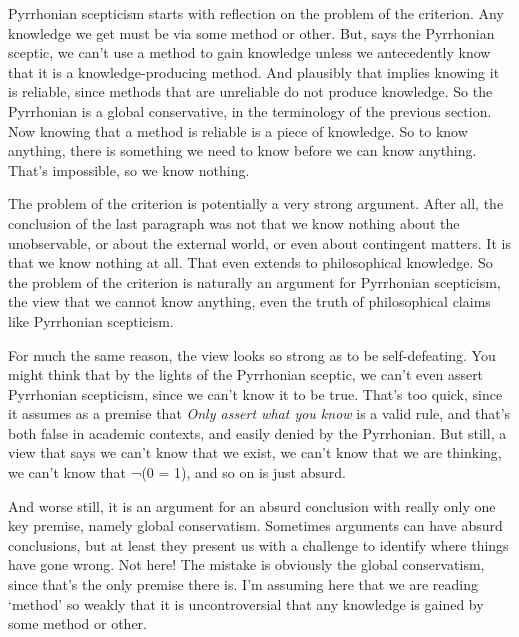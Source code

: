 \documentclass[
  10pt,
  letterpaper,
  twoside]{scrbook}
\begin{document}
Pyrrhonian scepticism starts with reflection on the problem of the
criterion. Any knowledge we get must be via some method or other. But,
says the Pyrrhonian sceptic, we can't use a method to gain knowledge
unless we antecedently know that it is a knowledge-producing method. And
plausibly that implies knowing it is reliable, since methods that are
unreliable do not produce knowledge. So the Pyrrhonian is a global
conservative, in the terminology of the previous section. Now knowing
that a method is reliable is a piece of knowledge. So to know anything,
there is something we need to know before we can know anything. That's
impossible, so we know nothing.

The problem of the criterion is potentially a very strong argument.
After all, the conclusion of the last paragraph was not that we know
nothing about the unobservable, or about the external world, or even
about contingent matters. It is that we know nothing at all. That even
extends to philosophical knowledge. So the problem of the criterion is
naturally an argument for Pyrrhonian scepticism, the view that we cannot
know anything, even the truth of philosophical claims like Pyrrhonian
scepticism.

For much the same reason, the view looks so strong as to be
self-defeating. You might think that by the lights of the Pyrrhonian
sceptic, we can't even assert Pyrrhonian scepticism, since we can't know
it to be true. That's too quick, since it assumes as a premise that
\emph{Only assert what you know} is a valid rule, and that's both false
in academic contexts, and easily denied by the Pyrrhonian. But still, a
view that says we can't know that we exist, we can't know that we are
thinking, we can't know that ¬(0 = 1), and so on is just absurd.

And worse still, it is an argument for an absurd conclusion with really
only one key premise, namely global conservatism. Sometimes arguments
can have absurd conclusions, but at least they present us with a
challenge to identify where things have gone wrong. Not here! The
mistake is obviously the global conservatism, since that's the only
premise there is. I'm assuming here that we are reading `method' so
weakly that it is uncontroversial that any knowledge is gained by some
method or other.
\end{document}
